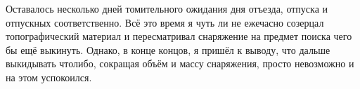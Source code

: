 Оставалось несколько дней томительного ожидания дня отъезда, отпуска и отпускных соответственно. Всё это время я чуть ли не ежечасно созерцал топографический материал и пересматривал снаряжение на предмет поиска чего бы ещё выкинуть. Однако, в конце концов, я пришёл к выводу, что дальше выкидывать что\sdash либо, сокращая объём и массу снаряжения, просто невозможно и на этом успокоился.

\begin{center}
\end{center}
